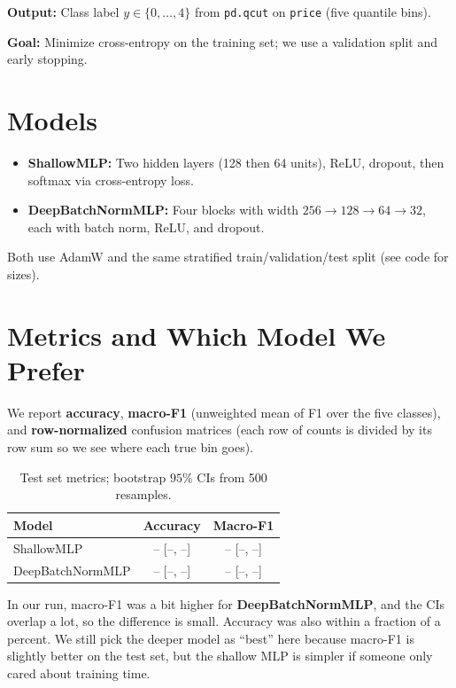 \documentclass[conference]{IEEEtran}
\newcommand{\ShallowMLPAcc}{--}\newcommand{\ShallowMLPAccLo}{--}\newcommand{\ShallowMLPAccHi}{--}%
\newcommand{\ShallowMLPFone}{--}\newcommand{\ShallowMLPFoneLo}{--}\newcommand{\ShallowMLPFoneHi}{--}%
\newcommand{\DeepBatchNormMLPAcc}{--}\newcommand{\DeepBatchNormMLPAccLo}{--}\newcommand{\DeepBatchNormMLPAccHi}{--}%
\newcommand{\DeepBatchNormMLPFone}{--}\newcommand{\DeepBatchNormMLPFoneLo}{--}\newcommand{\DeepBatchNormMLPFoneHi}{--}%
\begin{document}
\textbf{Output:} Class label $y \in \{0,\ldots,4\}$ from \texttt{pd.qcut} on \texttt{price} (five quantile bins).

\textbf{Goal:} Minimize cross-entropy on the training set; we use a validation split and early stopping.

\section{Models}
\begin{itemize}
  \item \textbf{ShallowMLP:} Two hidden layers (128 then 64 units), ReLU, dropout, then softmax via cross-entropy loss.
  \item \textbf{DeepBatchNormMLP:} Four blocks with width $256 \rightarrow 128 \rightarrow 64 \rightarrow 32$, each with batch norm, ReLU, and dropout.
\end{itemize}
Both use AdamW and the same stratified train/validation/test split (see code for sizes).

\section{Metrics and Which Model We Prefer}
We report \textbf{accuracy}, \textbf{macro-F1} (unweighted mean of F1 over the five classes), and \textbf{row-normalized} confusion matrices (each row of counts is divided by its row sum so we see where each true bin goes).

\begin{table}[htbp]
\centering
\caption{Test set metrics; bootstrap $95\%$ CIs from 500 resamples.}
\begin{tabular}{@{}lcc@{}}
\toprule
Model & Accuracy & Macro-F1 \\
\midrule
ShallowMLP & \ShallowMLPAcc{} [\ShallowMLPAccLo{}, \ShallowMLPAccHi{}] & \ShallowMLPFone{} [\ShallowMLPFoneLo{}, \ShallowMLPFoneHi{}] \\
DeepBatchNormMLP & \DeepBatchNormMLPAcc{} [\DeepBatchNormMLPAccLo{}, \DeepBatchNormMLPAccHi{}] & \DeepBatchNormMLPFone{} [\DeepBatchNormMLPFoneLo{}, \DeepBatchNormMLPFoneHi{}] \\
\bottomrule
\end{tabular}
\end{table}

In our run, macro-F1 was a bit higher for \textbf{DeepBatchNormMLP}, and the CIs overlap a lot, so the difference is small. Accuracy was also within a fraction of a percent. We still pick the deeper model as ``best'' here because macro-F1 is slightly better on the test set, but the shallow MLP is simpler if someone only cared about training time.
\end{document}
